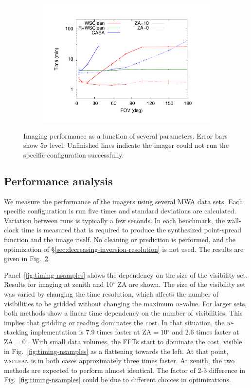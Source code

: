 \documentclass[useAMS,usenatbib]{mn2e}
\newcommand{\degree}{\ensuremath{^{\circ}}\xspace}
\begin{document}
\begin{figure}
\begin{subfigure}{.5\linewidth}
\includegraphics[width=\linewidth]{img/benchmark-fov/fov}
\caption{}\label{fig:timing-fov}%
\end{subfigure}%
\caption{Imaging performance as a function of several parameters. Error bars show 5$\sigma$ level. Unfinished lines indicate the imager could not run the specific configuration successfully.}\label{fig:timings}
\end{figure}

\subsection{Performance analysis}

We measure the performance of the imagers using several MWA data sets. Each specific configuration is run five times and standard deviations are calculated. Variation between runs is typically a few seconds. In each benchmark, the wall-clock time is measured that is required to produce the synthesized point-spread function and the image itself. No cleaning or prediction is performed, and the optimization of \S\ref{sec:decreasing-inversion-resolution} is not used. The results are given in Fig.~\ref{fig:timings}.

Panel~\ref{fig:timing-nsamples} shows the dependency on the size of the visibility set. Results for imaging at zenith and 10\degree ZA are shown. The size of the visibility set was varied by changing the time resolution, which affects the number of visibilities to be gridded without changing the maximum $w$-value. For larger sets, both methods show a linear time dependency on the number of visibilities. This implies that gridding or reading dominates the cost. In that situation, the $w$-stacking implementation is 7.9 times faster at $\textrm{ZA}=10\degree$ and 2.6 times faster at $\textrm{ZA}=0\degree$. With small data volumes, the FFTs start to dominate the cost, visible in Fig.~\ref{fig:timing-nsamples} as a flattening towards the left. At that point, \textsc{wsclean} is in both cases approximately three times faster. At zenith, the two methods are expected to perform almost identical. The factor of 2-3 difference in Fig.~\ref{fig:timing-nsamples} could be due to different choices in optimizations.
\end{document}
